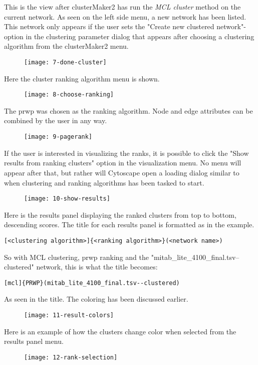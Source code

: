 This is the view after clusterMaker2 has run the \textit{MCL cluster} method on
the current network. As seen on the left side menu, a new network has been
listed. This network only appears if the user sets the "Create new clustered
network"-option in the clustering parameter dialog that appears after choosing a
clustering algorithm from the clusterMaker2 menu.
\begin{figure}[H]
    \texttt{[image: 7-done-cluster]}
\end{figure}

Here the cluster ranking algorithm menu is shown.
\begin{figure}[H]
    \texttt{[image: 8-choose-ranking]}
\end{figure}

The \gls{prwp} was chosen as the ranking algorithm. Node and edge attributes can
be combined by the user in any way. 
\begin{figure}[H]
    \texttt{[image: 9-pagerank]}
\end{figure}

If the user is interested in visualizing the ranks, it is possible to click the
"Show results from ranking clusters" option in the visualization menu. No menu
will appear after that, but rather will Cytoscape open a loading dialog similar
to when clustering and ranking algorithms has been tasked to start.
\begin{figure}[H]
    \texttt{[image: 10-show-results]}
\end{figure}

Here is the results panel displaying the ranked clusters from top to bottom,
descending scores. The title for each results panel is formatted as in the
example.
\begin{verbatim}
[<clustering algorithm>]{<ranking algorithm>}(<network name>)
\end{verbatim}
So with MCL clustering, \gls{prwp} ranking and the
"mitab\_lite\_4100\_final.tsv--clustered" network, this is what the title
becomes:
\begin{verbatim}
[mcl]{PRWP}(mitab_lite_4100_final.tsv--clustered)
\end{verbatim}
As seen in the title. The coloring has been discussed earlier.
\begin{figure}[H]
    \texttt{[image: 11-result-colors]}
\end{figure}

Here is an example of how the clusters change color when selected from the
results panel menu.
\begin{figure}[H]
    \texttt{[image: 12-rank-selection]}
\end{figure}

